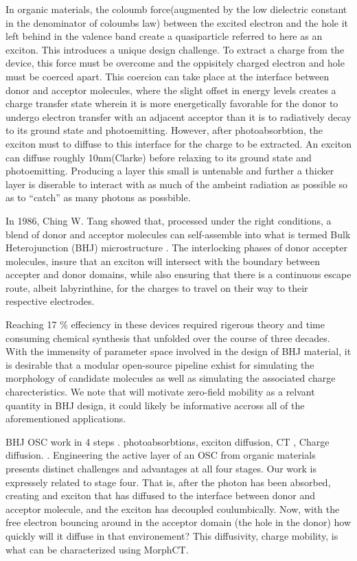 In organic materials, the coloumb force(augmented by the low dielectric constant in the denominator of coloumbs law) between the excited
electron and the hole it left behind in the valence band create a quasiparticle referred to here as an exciton. 
This introduces a unique design challenge. 
To extract a charge from the device, this force must be overcome and the oppisitely charged electron and hole 
must be coerced apart. This coercion can take place at the interface between donor and acceptor molecules,
where the slight offset in energy levels creates a charge transfer state wherein it is more
energetically favorable for the donor to undergo electron transfer with an adjacent acceptor than
it is to radiatively decay to its ground state and photoemitting.
However, after photoabsorbtion, the exciton must to diffuse to this interface for the charge to be
extracted. An exciton can diffuse roughly 10nm(Clarke) before relaxing
to its ground state and photoemitting. Producing a layer this small is untenable and further a thicker layer
is diserable to interact with as much of the ambeint radiation as possible so as to ``catch'' as many photons
as possbible. 

In 1986, Ching W. Tang
showed that, processed under the right conditions, a blend of donor and acceptor molecules can self-assemble
into what is termed Bulk Heterojunction (BHJ) microstructure \cite{Tang1986c}. 
The interlocking phases of donor accepter molecules, insure
that an exciton will intersect with the boundary between accepter and donor domains, while also ensuring that
there
is a continuous escape route, albeit labyrinthine, for the charges to travel on their way to their respective electrodes. 

Reaching 17 \% effeciency in these devices required rigerous theory and time consuming chemical synthesis
that unfolded over the course of three decades. 
With the immensity of parameter space involved in the design of BHJ material, it is desirable that a modular
open-source pipeline exhist for simulating the morphology of candidate molecules as well as simulating the 
associated charge charecteristics. We note that will motivate zero-field mobility as a relvant quantity in BHJ
design, it could likely be informative accross all of the aforementioned applications. 


BHJ OSC work in 4 steps . photoabsorbtions, exciton diffusion, CT , Charge diffusion. \citet{Fusella2019}.
Engineering the active layer of an OSC from organic materials presents distinct challenges and advantages at
all four stages. 
Our work is expressely related to stage four. That is, after the photon has been absorbed, creating and
exciton that has diffused to the interface between donor and acceptor molecule, and the exciton has decoupled
coulumbically. Now, with the free electron bouncing around in the acceptor domain (the hole in the donor) how
quickly will it diffuse in that environement? This diffusivity, charge mobility, is what can be characterized
using MorphCT.


